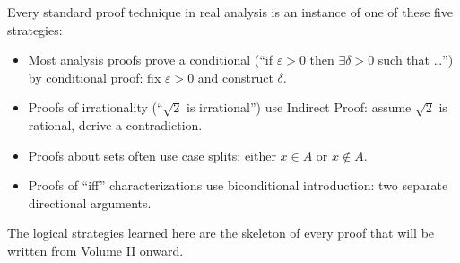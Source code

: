 \begin{remark}
Every standard proof technique in real analysis is an instance of one of these
five strategies:
\begin{itemize}
\item Most analysis proofs prove a conditional (``if $\varepsilon > 0$ then
  $\exists \delta > 0$ such that \ldots'') by conditional proof: fix
  $\varepsilon > 0$ and construct $\delta$.
\item Proofs of irrationality (``$\sqrt{2}$ is irrational'') use Indirect
  Proof: assume $\sqrt{2}$ is rational, derive a contradiction.
\item Proofs about sets often use case splits: either $x \in A$ or $x \notin A$.
\item Proofs of ``iff'' characterizations use biconditional introduction: two
  separate directional arguments.
\end{itemize}
The logical strategies learned here are the skeleton of every proof that will
be written from Volume II onward.
\end{remark}
